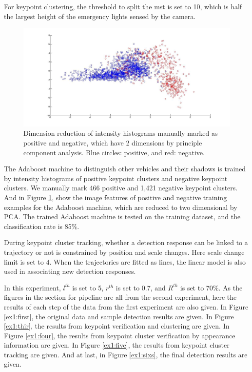 For keypoint clustering, the threshold to split the mst is set to 10, which is half the largest height of the emergency lights sensed by the camera.

\begin{figure}
\includegraphics[width=1\textwidth,bb=0 0 1367 651]{untitled.jpg}
\caption[Positive and negative training examples]{Dimension reduction of intensity histograms manually marked as positive and negative, which have 2 dimensions by principle component analysis. Blue circles: positive, and red: negative.}
\label{ex1:v}
\end{figure}

 The Adaboost machine to distinguish other vehicles and their shadows is trained by intensity histograms of positive keypoint clusters and negative keypoint clusters. We manually mark 466 positive  and 1,421 negative keypoint clusters. And in Figure \ref{ex1:v}, show the image features of positive and negative training examples for the Adaboost machine, which are reduced to two dimensional by PCA. The trained Adaboost machine is tested on the training dataset, and the classification rate is 85\%.

During keypoint cluster tracking, whether a detection response can be linked to a trajectory or not is constrained by position and scale changes. Here scale change limit is set to 4. When the trajectories are fitted as lines, the linear model is also used in associating new detection responses.


In this experiment, $l^{th}$ is set to 5, $r^{th}$ is set to 0.7, and $R^{th}$ is set to 70\%. As the figures in the section for pipeline are all from the second experiment, here the results of each step of the data from the first experiment are also given. In Figure \ref{ex1:first}, the original data and sample detection results are given. In Figure \ref{ex1:thir}, the results from keypoint verification and clustering are given. In Figure \ref{ex1:four}, the results from keypoint cluster verification by appearance information are given. In Figure \ref{ex1:five}, the results from keypoint cluster tracking are given. And at last, in Figure \ref{ex1:sixs}, the final detection results are given.

